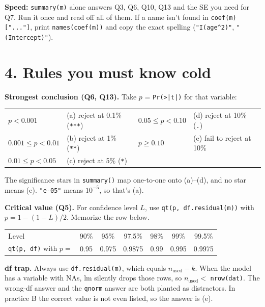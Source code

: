\documentclass[10pt]{article}
\newcommand{\code}[1]{\texttt{#1}}
\begin{document}
\begin{tip}
\textbf{Speed:} \code{summary(m)} alone answers Q3, Q6, Q10, Q13 and the SE you need for Q7. Run it once and read off all of them. If a name isn't found in \code{coef(m)["..."]}, print \code{names(coef(m))} and copy the exact spelling (\code{"I(age\^{}2)"}, \code{"(Intercept)"}).
\end{tip}

\section*{4. Rules you must know cold}

\textbf{Strongest conclusion (Q6, Q13).} Take $p$ = \code{Pr(>|t|)} for that variable:
\begin{center}\small
\begin{tabular}{@{}ll@{\qquad}ll@{}}
\toprule
$p<0.001$ & (a) reject at 0.1\% (\code{***}) & $0.05\le p<0.10$ & (d) reject at 10\% (\code{.})\\
$0.001\le p<0.01$ & (b) reject at 1\% (\code{**}) & $p\ge0.10$ & (e) fail to reject at 10\%\\
$0.01\le p<0.05$ & (c) reject at 5\% (\code{*}) & & \\ \bottomrule
\end{tabular}
\end{center}
The significance stars in \code{summary()} map one-to-one onto (a)--(d), and no star means (e). \code{"e-05"} means $10^{-5}$, so that's (a).

\textbf{Critical value (Q5).} For confidence level $L$, use \code{qt(p, df.residual(m))} with $p = 1-(1-L)/2$. Memorize the row below.
\begin{center}\small
\begin{tabular}{@{}l*{6}{c}@{}}\toprule
Level & 90\% & 95\% & 97.5\% & 98\% & 99\% & 99.5\%\\
\code{qt(p, df)} with $p=$ & 0.95 & 0.975 & 0.9875 & 0.99 & 0.995 & 0.9975\\ \bottomrule
\end{tabular}
\end{center}

\begin{trap}
\textbf{df trap.} Always use \code{df.residual(m)}, which equals $n_{\text{used}} - k$. When the model has a variable with NAs, lm silently drops those rows, so $n_{\text{used}} < $ \code{nrow(dat)}. The wrong-df answer and the \code{qnorm} answer are both planted as distractors. In practice B the correct value is not even listed, so the answer is (e).
\end{trap}
\end{document}
